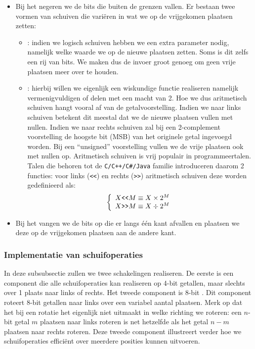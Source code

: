 \begin{itemize}
 \item Bij het  negeren we de bits die buiten de grenzen vallen. Er bestaan twee vormen van schuiven die vari\"eren in wat we op de vrijgekomen plaatsen zetten:
 \begin{itemize}
   \item {}: indien we logisch schuiven hebben we een extra parameter nodig, namelijk welke waarde we op de nieuwe plaatsen zetten. Soms is dit zelfs een rij van bits. We maken dus de invoer groot genoeg om geen vrije plaatsen meer over te houden.
   \item {}: hierbij willen we eigenlijk een wiskundige functie realiseren namelijk vermenigvuldigen of delen met een macht van 2. Hoe we dus aritmetisch schuiven hangt vooral af van de getalvoorstelling. Indien we naar links schuiven betekent dit meestal dat we de nieuwe plaatsen vullen met nullen. Indien we naar rechts schuiven zal bij een 2-complement voorstelling de hoogste bit (MSB) van het originele getal ingevoegd worden. Bij een ``unsigned'' voorstelling vullen we de vrije plaatsen ook met nullen op. Aritmetisch schuiven is vrij populair in programmeertalen. Talen die behoren tot de \verb|C/C++/C#/Java| familie introduceren daarom 2 functies: voor links (\verb+<<+) en rechts (\verb+>>+) aritmetisch schuiven deze worden gedefinieerd als:
\begin{equation}
\left\{\begin{array}{l}
X\verb+<<+M\equiv X\times 2^M\\
X\verb+>>+M\equiv X\div 2^M
\end{array}\right.
\end{equation}
 \end{itemize}
 \item Bij het  vangen we de bits op die er langs \'e\'en kant afvallen en plaatsen we deze op de vrijgekomen plaatsen aan de andere kant.
\end{itemize}
\subsubsection{Implementatie van schuifoperaties}
In deze subsubsectie zullen we twee schakelingen realiseren. De eerste is een component die alle schuifoperaties kan realiseren op 4-bit getallen, maar slechts over 1 plaats naar links of rechts. Het tweede component is 8-bit . Dit component roteert 8-bit getallen naar links over een variabel aantal plaatsen. Merk op dat het bij een rotatie het eigenlijk niet uitmaakt in welke richting we roteren: een $n$-bit getal $m$ plaatsen naar links roteren is net hetzelfde als het getal $n-m$ plaatsen naar rechts roteren. Deze tweede component illustreert verder hoe we schuifoperaties effici\"ent over meerdere posities kunnen uitvoeren.
